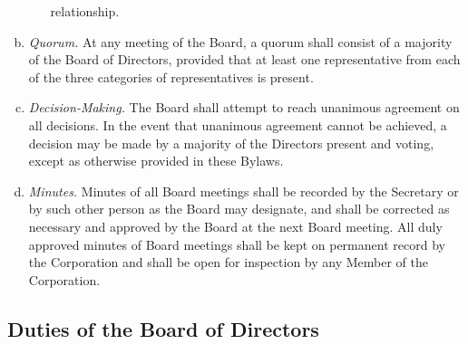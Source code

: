 \begin{enumerate}[a.]
\begin{enumerate}[(1)]
    relationship.
  \end{enumerate}
\item \emph{Quorum.}  At any meeting of the Board, a quorum shall
  consist of a majority of the Board of Directors, provided that at
  least one representative from each of the three categories of
  representatives is present.
\item \emph{Decision-Making.}  The Board shall attempt to reach
  unanimous agreement on all decisions. In the event that unanimous
  agreement cannot be achieved, a decision may be made by a majority
  of the Directors present and voting, except as otherwise provided in
  these Bylaws.
\item \emph{Minutes.}  Minutes of all Board meetings shall be recorded
  by the Secretary or by such other person as the Board may designate,
  and shall be corrected as necessary and approved by the Board at the
  next Board meeting. All duly approved minutes of Board meetings
  shall be kept on permanent record by the Corporation and shall be
  open for inspection by any Member of the Corporation.
\end{enumerate}
  
\subsection{Duties of the Board of Directors}

